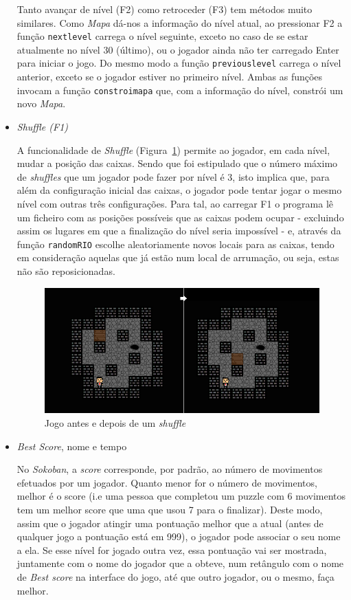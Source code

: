 \documentclass[a4paper]{article}
\begin{document}
\begin{itemize}
Tanto avançar de nível (F2) como retroceder (F3) tem métodos muito similares. Como \emph{Mapa} dá-nos a informação do nível atual, ao pressionar F2 a função \texttt{nextlevel} carrega o nível seguinte, exceto no caso de se estar atualmente no nível 30 (último), ou o jogador ainda não ter carregado Enter para iniciar o jogo. Do mesmo modo a função \texttt{previouslevel} carrega o nível anterior, exceto se o jogador estiver no primeiro nível. Ambas as funções invocam a função \texttt{constroimapa} que, com a informação do nível, constrói um novo \emph{Mapa}.

\smallskip
\item \emph{Shuffle (F1)}

A funcionalidade de \emph{Shuffle} (Figura~\ref{fig:shuffle}) permite ao jogador, em cada nível, mudar a posição das caixas. Sendo que foi estipulado que o número máximo de \emph{shuffles} que um jogador pode fazer por nível é 3, isto implica que, para além da configuração inicial das caixas, o jogador pode tentar jogar o mesmo nível com outras três configurações. Para tal, ao carregar F1 o programa lê um ficheiro com as posições possíveis que as caixas podem ocupar - excluindo assim os lugares em que a finalização do nível seria impossível - e, através da função \texttt{randomRIO} escolhe aleatoriamente novos locais para as caixas, tendo em consideração aquelas que já estão num local de arrumação, ou seja, estas não são reposicionadas.

\begin{figure}[H]
\centering
\includegraphics[width=12cm]{shuffle.png}
\caption{Jogo antes e depois de um \emph{shuffle}}
\label{fig:shuffle}
\end{figure}

\smallskip
\item \emph{Best Score}, nome e tempo

No \emph{Sokoban}, a \emph{score} corresponde, por padrão, ao número de movimentos efetuados por um jogador. Quanto menor for o número de movimentos, melhor é o score (i.e uma pessoa que completou um puzzle com 6 movimentos tem um melhor score que uma que usou 7 para o finalizar). Deste modo, assim que o jogador atingir uma pontuação melhor que a atual (antes de qualquer jogo a pontuação está em 999), o jogador pode associar o seu nome a ela. Se esse nível for jogado outra vez, essa pontuação vai ser mostrada, juntamente com o nome do jogador que a obteve, num retângulo com o nome de \emph{Best score} na interface do jogo, até que outro jogador, ou o mesmo, faça melhor.


\end{itemize}
\end{document}
